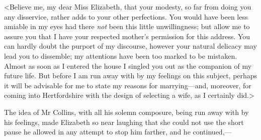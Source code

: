 <Believe me, my dear Miss Elizabeth, that your modesty, so far from doing you any disservice, rather adds to your other perfections. You would have been less amiable in my eyes had there \textit{not} been this little unwillingness; but allow me to assure you that I have your respected mother's permission for this address. You can hardly doubt the purport of my discourse, however your natural delicacy may lead you to dissemble; my attentions have been too marked to be mistaken. Almost as soon as I entered the house I singled you out as the companion of my future life. But before I am run away with by my feelings on this subject, perhaps it will be advisable for me to state my reasons for marrying—and, moreover, for coming into Hertfordshire with the design of selecting a wife, as I certainly did.>



The idea of Mr Collins, with all his solemn composure, being run away with by his feelings, made Elizabeth so near laughing that she could not use the short pause he allowed in any attempt to stop him farther, and he continued,—

